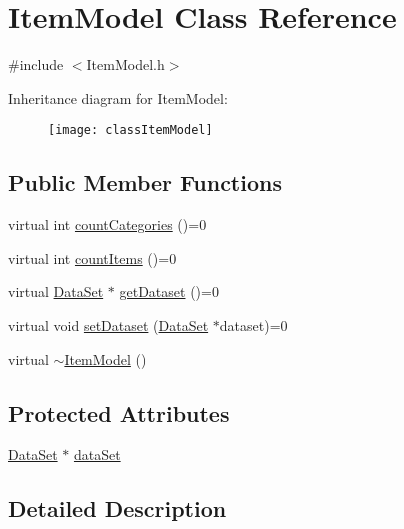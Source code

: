 \hypertarget{classItemModel}{}\section{Item\+Model Class Reference}
\label{classItemModel}


{\ttfamily \#include $<$Item\+Model.\+h$>$}

Inheritance diagram for Item\+Model\+:\begin{figure}[H]
\begin{center}
\leavevmode
\texttt{[image: classItemModel]}
\end{center}
\end{figure}
\subsection*{Public Member Functions}
\begin{DoxyCompactItemize}
\item 
virtual int \hyperlink{classItemModel_af0aabe9f48c6d111fbcb903cb330fae7}{count\+Categories} ()=0
\item 
virtual int \hyperlink{classItemModel_a7a93c60e346f4d80f265a4c9e083181d}{count\+Items} ()=0
\item 
virtual \hyperlink{classDataSet}{Data\+Set} $\ast$ \hyperlink{classItemModel_a8521ea3f8f511e88d5257ff7591cd928}{get\+Dataset} ()=0
\item 
virtual void \hyperlink{classItemModel_accd6c6b6827c45970d04c22baaca6b0c}{set\+Dataset} (\hyperlink{classDataSet}{Data\+Set} $\ast$dataset)=0
\item 
virtual \hyperlink{classItemModel_ac824a8715e939060d4efdee0949d02cf}{$\sim$\+Item\+Model} ()
\end{DoxyCompactItemize}
\subsection*{Protected Attributes}
\begin{DoxyCompactItemize}
\item 
\hyperlink{classDataSet}{Data\+Set} $\ast$ \hyperlink{classItemModel_a160f86bf5a0eba987f4c8a8499e448a6}{data\+Set}
\end{DoxyCompactItemize}


\subsection{Detailed Description}


